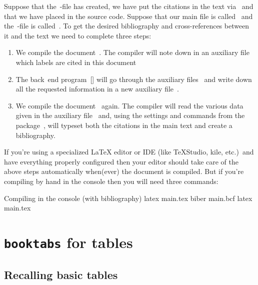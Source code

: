 Suppose that the~-file has created, we have put the citations in the text via~ and that we have placed  in the source code.
Suppose that our main file is called~ and the~-file is called~.
To get the desired bibliography and cross-references between it and the text we need to complete three steps:
\begin{enumerate}
  \item
    We compile the document~.
    The compiler will note down in an auxiliary file~ which labels are cited in this document
  \item
    The back~end program~[\appname] will go through the auxiliary files~ and write down all the requested information in a new auxiliary file~.
  \item
    We compile the document~ again.
    The compiler will read the various data given in the auxiliary file~ and, using the settings and commands from the package~, will typeset both the citations in the main text and create a bibliography.
\end{enumerate}
If you’re using a specialized {\LaTeX} editor or IDE (like {\TeX}Studio, kile, etc.)\ and have everything properly configured then your editor should take care of the above steps automatically when(ever) the document is compiled.
But if you’re compiling by hand in the console then you will need three commands:
\begin{showcode}{Compiling in the console (with bibliography)}
latex main.tex
biber main.bcf
latex main.tex
\end{showcode}






\section{\texttt{booktabs} for tables}



\subsection{Recalling basic tables}

